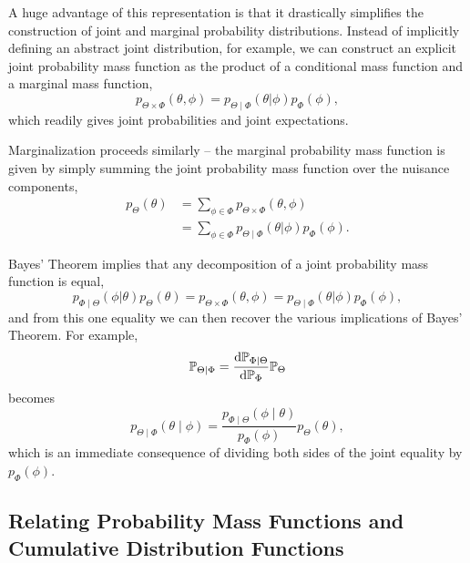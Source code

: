 A huge advantage of this representation is that it drastically simplifies the
construction of joint and marginal probability distributions.  Instead of 
implicitly defining an abstract joint distribution, for example, we can construct 
an explicit joint probability mass function as the product of a conditional
mass function and a marginal mass function,
%
\begin{equation*}
p_{\Theta \times \Phi} \! \left( \theta, \phi \right) = 
p_{\Theta \mid \Phi} \! \left( \theta | \phi \right) p_{\Phi} \! \left( \phi \right),
\end{equation*}
%
which readily gives joint probabilities and joint expectations.

Marginalization proceeds similarly -- the marginal probability mass function
is given by simply summing the joint probability mass function over the
nuisance components,
%
\begin{align*}
p_{\Theta} \! \left( \theta \right)
&= 
\sum_{\phi \in \Phi}  p_{\Theta \times \Phi} \! \left( \theta, \phi \right) \\
&=
\sum_{\phi \in \Phi}
p_{\Theta \mid \Phi} \! \left( \theta | \phi \right) p_{\Phi} \! \left( \phi \right).
\end{align*}

Bayes' Theorem implies that any decomposition of a joint probability
mass function is equal,
%
\begin{equation*}
p_{\Phi \mid \Theta} \! \left( \phi | \theta \right) p_{\Theta} \! \left( \theta \right)
=
p_{\Theta \times \Phi} \! \left( \theta, \phi \right) 
= 
p_{\Theta \mid \Phi} \! \left( \theta | \phi \right) p_{\Phi} \! \left( \phi \right),
\end{equation*}
%
and from this one equality we can then recover the various implications of
Bayes' Theorem.  For example,
%
\begin{equation*}
\mathbb{P}_{\Theta \mid \Phi} =
\frac{ \mathrm{d} \mathbb{P}_{\Phi \mid \Theta} }{ \mathrm{d} \mathbb{P}_{\Phi} }
\mathbb{P}_{\Theta}
\end{equation*}
%
becomes
%
\begin{equation*}
p_{\Theta \mid \Phi} \! \left( \theta \mid \phi \right) =
\frac{ p_{\Phi \mid \Theta} \! \left( \phi \mid \theta \right) }
{ p_{\Phi} \! \left( \phi \right) }
p_{\Theta} \! \left( \theta \right),
\end{equation*}
%
which is an immediate consequence of dividing both sides of the joint
equality by $p_{\Phi} \! \left( \phi \right)$.

\subsection{Relating Probability Mass Functions and Cumulative 
Distribution Functions}

